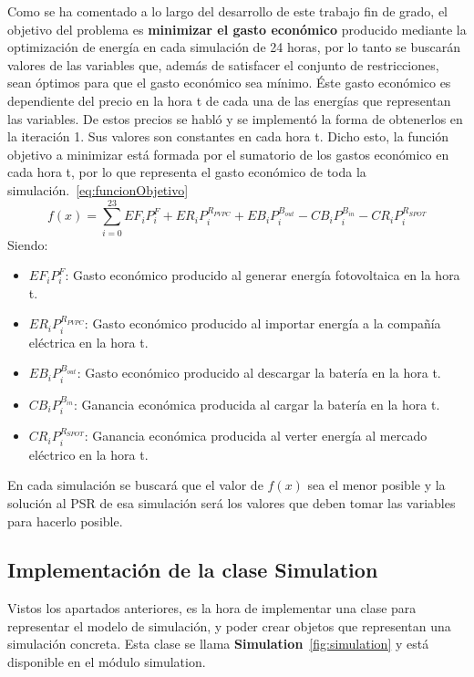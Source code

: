 Como se ha comentado a lo largo del desarrollo de este trabajo fin de grado, el objetivo del problema es \textbf{minimizar el gasto económico} producido mediante la optimización de energía en cada simulación de 24 horas, por lo tanto se buscarán valores de las variables que, además de satisfacer el conjunto de restricciones, sean óptimos para que el gasto económico sea mínimo. Éste gasto económico es dependiente del precio en la hora t de cada una de las energías que representan las variables. De estos precios se habló y se implementó la forma de obtenerlos en la iteración 1. Sus valores son constantes en cada hora t. Dicho esto, la función objetivo a minimizar está formada por el sumatorio de los gastos económico en cada hora t, por lo que representa el gasto económico de toda la simulación.~\ref{eq:funcionObjetivo}
\begin{equation}
\label{eq:funcionObjetivo}
f(x) = \sum_{i=0}^{23} EF_{i}P_{i}^{F} + ER_{i}P_{i}^{R_{PVPC}} + EB_{i}P_{i}^{B_{out}} - CB_{i}P_{i}^{B_{in}} - CR_{i}P_{i}^{R_{SPOT}}
\end{equation}
Siendo:
\begin{itemize}
\item $ EF_{i}P_{i}^{F} $: Gasto económico producido al generar energía fotovoltaica en la hora t.
\item $ ER_{i}P_{i}^{R_{PVPC}} $: Gasto económico producido al importar energía a la compañía eléctrica en la hora t.
\item $ EB_{i}P_{i}^{B_{out}} $: Gasto económico producido al descargar la batería en la hora t.
\item $ CB_{i}P_{i}^{B_{in}} $: Ganancia económica producida al cargar la batería en la hora t.
\item $ CR_{i}P_{i}^{R_{SPOT}} $: Ganancia económica producida al verter energía al mercado eléctrico en la hora t.
\end{itemize}

En cada simulación se buscará que el valor de $ f(x) $ sea el menor posible y la solución al PSR de esa simulación será los valores que deben tomar las variables para hacerlo posible.

\subsection{Implementación de la clase Simulation}
Vistos los apartados anteriores, es la hora de implementar una clase para representar el modelo de simulación, y poder crear objetos que representan una simulación concreta. Esta clase se llama \textbf{Simulation}~\ref{fig:simulation} y está disponible en el módulo simulation.\\

